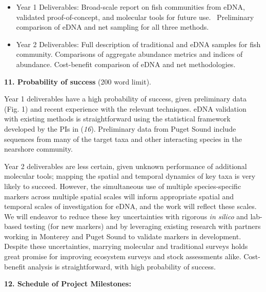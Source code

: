 \documentclass[]{article}
\providecommand{\tightlist}{%
  \setlength{\itemsep}{0pt}\setlength{\parskip}{0pt}}
\begin{document}
\begin{itemize}
\tightlist
\item
  {Year 1 Deliverables:} Broad-scale report on fish communities from
  eDNA, validated proof-of-concept, and molecular tools for future
  use.{~ }Preliminary comparison of eDNA and net sampling for all three
  methods.
\item
  {Year 2 Deliverables}: Full description of traditional and eDNA
  samples for fish community. Comparisons of aggregate abundance metrics
  and indices of abundance. Cost-benefit comparison of eDNA and net
  methodologies.
\end{itemize}

\textbf{11. Probability of success} (200 word limit).{~}

Year 1 deliverables have a high probability of success, given
preliminary data (Fig. 1) and recent experience with the relevant
techniques. eDNA validation with existing methods is straightforward
using the statistical framework developed by the PIs in (\emph{16}).
Preliminary data from Puget Sound include sequences from many of the
target taxa and other interacting species in the nearshore community.

Year 2 deliverables are less certain, given unknown performance of
additional molecular tools; mapping the spatial and temporal dynamics of
key taxa is very likely to succeed. However, the simultaneous use of
multiple species-specific markers across multiple spatial scales will
inform appropriate spatial and temporal scales of investigation for
eDNA, and the work will reflect these scales. We will endeavor to reduce
these key uncertainties with rigorous \emph{in silico} and lab-based
testing (for new markers) and by leveraging existing research with
partners working in Monterey and Puget Sound to validate markers in
development. Despite these uncertainties, marrying molecular and
traditional surveys holds great promise for improving ecosystem surveys
and stock assessments alike. Cost-benefit analysis is straightforward,
with high probability of success.\textbf{}

\textbf{12. Schedule of Project Milestones:{~}}
\end{document}
